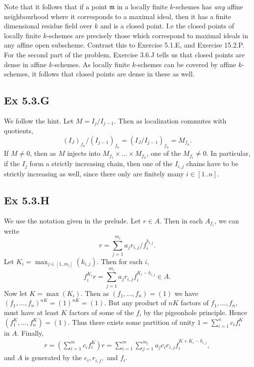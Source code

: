 \documentclass{article}
\theoremstyle{definition}
\begin{document}
Note that it follows that if a point $\mathfrak{m}$ in a locally finite
$k$-schemes has \emph{any} affine neighbourhood where it corresponds to a
maximal ideal, then it has a finite dimensional residue field over $k$ and is a
closed point. I.e the closed points of locally finite $k$-schemes are precisely
those which correspond to maximal ideals in any affine open subscheme. Contrast
this to Exercise 5.1.E, and Exercise 15.2.P. \\

For the second part of the problem, Exercise 3.6.J tells us that closed points
are dense in affine $k$-schemes. As locally finite $k$-schemes can be covered
by affine $k$-schemes, it follows that closed points are dense in these as
well.


\subsection*{Ex 5.3.G}

We follow the hint. Let $M = I_{j} / I_{j - 1}$. Then as localization commutes with quotients,
\begin{equation*}
	(I_{J})_{f_n} / (I_{j - 1})_{f_n}
	=
	(I_{J} / I_{j - 1})_{f_n} 
	=
	M_{f_n}.
\end{equation*}
If $M \not = 0$, then as $M$ injects into $M_{f_1} \times \ldots \times
M_{f_n}$, one of the $M_{f_i} \not = 0$. In particular, if the $I_j$ form a
strictly increasing chain, then one of the $I_{i, j}$ chains have to be
strictly increasing as well, since there only are finitely many $i \in [1..n]$.

\subsection*{Ex 5.3.H}

We use the notation given in the prelude. Let $r \in A$.
Then in each $A_{f_i}$, we can write 
\[
	r
	=
	\sum_{j = 1}^{m_i} a_j r_{i, j}/f_{i}^{k_{i, j}}.
\] 
Let $K_i = \max_{j \in [1..m_i]}(k_{i, j})$. Then for each $i$,
\[
	f_i^{K_i} r
	=
	\sum_{j = 1}^{m_i} a_j r_{i, j} f_i^{K_i - k_{i, j}}
	\in
	A.
\] 
Now let $K = \max(K_i)$. Then as $(f_1, \ldots, f_n) = (1)$ we have $(f_1,
\ldots, f_n)^{nK} = (1)^{nK} = (1)$. But any product of $nK$ factors of $f_1,
\ldots, f_n$, must have at least $K$ factors of some of the $f_i$ by the
pigeonhole principle. Hence $(f_1^K, \ldots, f_n^K) = (1)$. Thus there exists
some partition of unity $1 = \sum_{i = 1}^{n} c_i f_i^K$ in $A$. Finally,
\begin{align*}
	r
	=
	\left(
		\sum_{i = 1}^{m}
		c_i f_i^K
	\right)
	r
	=
	\sum_{i = 1}^{m}
	\sum_{j = 1}^{m_i} a_j c_i r_{i, j} f_i^{K + K_i - k_{i, j}},
\end{align*}
and $A$ is generated by the $c_i, r_{i, j},$ and $f_i$.
\end{document}
